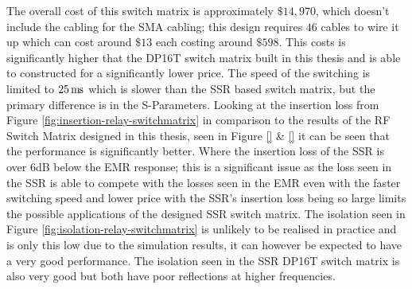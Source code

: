\documentclass[12pt,openany,a4paper]{book}
\newcommand{\pack}	{\hspace{-0.08em}}
\newcommand{\ms}	{\ensuremath{\rm\,m\pack s}}
\begin{document}
The overall cost of this switch matrix is approximately $\$14,970$, which doesn't include the cabling for the SMA cabling; this design requires $46$ cables to wire it up which can cost around $\$13 $ each costing around $\$598$. This costs is significantly higher that the DP16T switch matrix built in this thesis and is able to constructed for a significantly lower price. The speed of the switching is limited to $25\ms$ which is slower than the SSR based switch matrix, but the primary difference is in the S-Parameters. Looking at the insertion loss from Figure \ref{fig:insertion-relay-switchmatrix} in comparison to the results of the RF Switch Matrix designed in this thesis, seen in Figure \ref{} \& \ref{} it can be seen that the performance is significantly better. Where the insertion loss of the SSR is over $6$dB below the EMR response; this is a significant issue as the loss seen in the SSR is able to compete with the losses seen in the EMR even with the faster switching speed and lower price with the SSR's insertion loss being so large limits the possible applications of the designed SSR switch matrix. The isolation seen in Figure \ref{fig:isolation-relay-switchmatrix} is unlikely to be realised in practice and is only this low due to the simulation results, it can however be expected to have a very good performance. The isolation seen in the SSR DP16T switch matrix is also very good but both have poor reflections at higher frequencies. 
\end{document}
